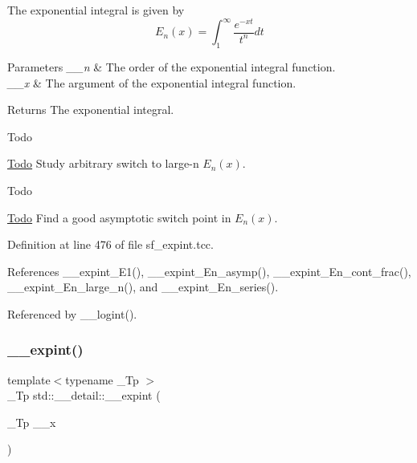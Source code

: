The exponential integral is given by \[ E_n(x) = \int_{1}^\infty \frac{e^{-xt}}{t^n} dt \]


\begin{DoxyParams}{Parameters}
{\em \+\_\+\+\_\+n} & The order of the exponential integral function. \\
\hline
{\em \+\_\+\+\_\+x} & The argument of the exponential integral function. \\
\hline
\end{DoxyParams}
\begin{DoxyReturn}{Returns}
The exponential integral. 
\end{DoxyReturn}
\begin{DoxyRefDesc}{Todo}
\item[\hyperlink{todo__todo000007}{Todo}]Study arbitrary switch to large-\/n $ E_n(x) $. \end{DoxyRefDesc}


\begin{DoxyRefDesc}{Todo}
\item[\hyperlink{todo__todo000008}{Todo}]Find a good asymptotic switch point in $ E_n(x) $. \end{DoxyRefDesc}


Definition at line 476 of file sf\+\_\+expint.\+tcc.



References \+\_\+\+\_\+expint\+\_\+\+E1(), \+\_\+\+\_\+expint\+\_\+\+En\+\_\+asymp(), \+\_\+\+\_\+expint\+\_\+\+En\+\_\+cont\+\_\+frac(), \+\_\+\+\_\+expint\+\_\+\+En\+\_\+large\+\_\+n(), and \+\_\+\+\_\+expint\+\_\+\+En\+\_\+series().



Referenced by \+\_\+\+\_\+logint().

\mbox{\label{namespacestd_1_1____detail_abefd4102ce8a673604204e360074ceaa}} 
\subsubsection{\texorpdfstring{\+\_\+\+\_\+expint()}{\_\_expint()}\hspace{0.1cm}{\footnotesize\ttfamily [2/2]}}
{\footnotesize\ttfamily template$<$typename \+\_\+\+Tp $>$ \\
\+\_\+\+Tp std\+::\+\_\+\+\_\+detail\+::\+\_\+\+\_\+expint (\begin{DoxyParamCaption}\item[{\+\_\+\+Tp}]{\+\_\+\+\_\+x }\end{DoxyParamCaption})}



